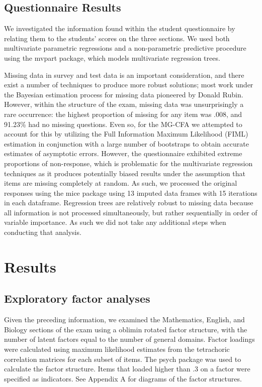 \documentclass{article}\usepackage[]{graphicx}\usepackage[]{color}
\begin{document}
\subsection{Questionnaire Results}

We investigated the information found within the student questionnaire by relating them to the students' scores on the three sections. We used both multivariate parametric regressions and a non-parametric predictive procedure using the mvpart package, which models multivariate regression trees.


Missing data in survey and test data is an important consideration, and there exist a number of techniques to produce more robust solutions; most work under the Bayesian estimation process for missing data pioneered by Donald Rubin\cite{rubin}. However, within the structure of the exam, missing data was unsurprisingly a rare occurrence: the highest proportion of missing for any item was .008, and 91.23\% had no missing questions. Even so, for the MG-CFA we attempted to account for this by utilizing the Full Information Maximum Likelihood (FIML) estimation in conjunction with a large number of bootstraps to obtain accurate estimates of asymptotic errors. However, the questionnaire exhibited extreme proportions of non-response, which is problematic for the multivariate regression techniques as it produces potentially biased results under the assumption that items are missing completely at random. As such, we processed the original responses using the mice package\cite{mie} using 13 imputed data frames with 15 iterations in each dataframe. Regression trees are relatively robust to missing data because all information is not processed simultaneously, but rather sequentially in order of variable importance. As such we did not take any additional steps when conducting that analysis.

\section{Results}
\subsection{Exploratory factor analyses}
Given the preceding information, we examined the Mathematics, English, and Biology sections of the exam using a oblimin rotated factor structure, with the number of latent factors equal to the number of general domains. Factor loadings were calculated using maximum likelihood estimates from the tetrachoric correlation matrices for each subset of items. The psych package was used to calculate the factor structure. Items that loaded higher than .3 on a factor were specified as indicators. See Appendix A for diagrams of the factor structures.
\end{document}
